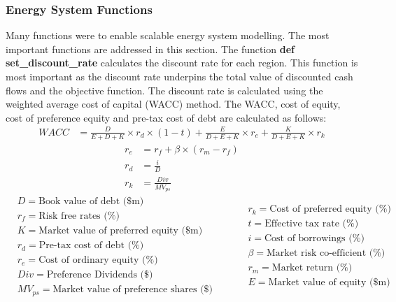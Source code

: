 \documentclass[12pt]{article}
\begin{document}
\subsubsection{Energy System Functions}
Many functions were to enable scalable energy system modelling. 
The most important functions are addressed in this section.
The function \textbf{def set\_discount\_rate} calculates the discount rate for each region.
This function is most important as the discount rate underpins the total value of discounted cash flows and the objective function.
The discount rate is calculated using the weighted average cost of capital (WACC) method.
The WACC, cost of equity, cost of preference equity and pre-tax cost of debt are calculated as follows:
\begin{align}
	WACC &= \frac{D}{E+D+K}\times r_d \times (1-t) + \frac{E}{D+E+K}\times r_e + \frac{K}{D+E+K}\times r_k
\end{align}
\begin{align}
	r_e &= r_f + \beta \times (r_m - r_f)\\
	r_d &= \frac{i}{D}\\
	r_k &= \frac{Div}{MV_{ps}}
\end{align}
\begin{equation*}
	\begin{split}
		&D= \text{Book value of debt (\$m)}\\
		&r_f= \text{Risk free rates (\%)}\\
		&K= \text{Market value of preferred equity (\$m)}\\
		&r_d= \text{Pre-tax cost of debt (\%)}\\
		&r_e= \text{Cost of ordinary equity (\%)}\\
		&Div= \text{Preference Dividends (\$)}\\
		& MV_{ps}= \text{Market value of preference shares (\$)}
	\end{split}
\quad\quad
	\begin{split}
		&r_k= \text{Cost of preferred equity (\%)}\\
		&t= \text{Effective tax rate (\%)}\\
		&i= \text{Cost of borrowings (\%)}\\
		&\beta= \text{Market risk co-efficient (\%)}\\
		&r_m= \text{Market return (\%)}\\
		&E= \text{Market value of equity (\$m)}
	\end{split}
\end{equation*}
\end{document}
